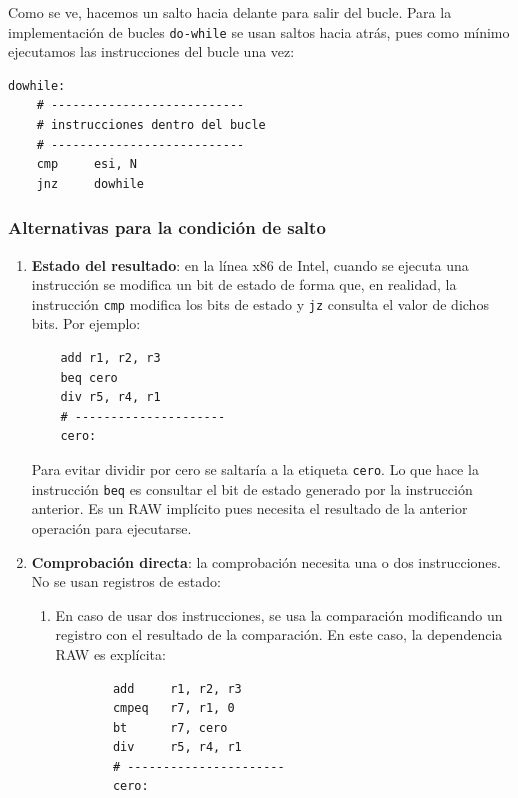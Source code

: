 \documentclass[10pt,a4paper,spanish]{report}
\begin{document}
Como se ve, hacemos un salto hacia delante para salir del bucle. Para la implementación de bucles \verb*|do-while| se usan saltos hacia atrás, pues como mínimo ejecutamos las instrucciones del bucle una vez:

\begin{verbatim}
dowhile:
    # ---------------------------
    # instrucciones dentro del bucle
    # ---------------------------
    cmp     esi, N
    jnz     dowhile
\end{verbatim}

\textcolor{azul}{\subsubsection{Alternativas para la condición de salto}}
\begin{enumerate}[\color{azul}{$\heartsuit$}]
    \item \textbf{\textcolor{azul}{Estado del resultado}}: en la línea x86 de Intel, cuando se ejecuta una instrucción se modifica un bit de estado de forma que, en realidad, la instrucción \verb*|cmp| modifica los bits de estado y \verb*|jz| consulta el valor de dichos bits. Por ejemplo:

    \begin{verbatim}
    add r1, r2, r3
    beq cero
    div r5, r4, r1
    # ---------------------
    cero:
    \end{verbatim}

    Para evitar dividir por cero se saltaría a la etiqueta \verb*|cero|. Lo que hace la instrucción \verb*|beq| es consultar el bit de estado generado por la instrucción anterior. Es un RAW implícito pues necesita el resultado de la anterior operación para ejecutarse.

    \item \textbf{\textcolor{azul}{Comprobación directa}}: la comprobación necesita una o dos instrucciones. No se usan registros de estado:
    \begin{enumerate}[$\longrightarrow$]
        \item En caso de usar dos instrucciones, se usa la comparación modificando un registro con el resultado de la comparación. En este caso, la dependencia RAW es explícita:

        \begin{verbatim}
        add     r1, r2, r3
        cmpeq   r7, r1, 0
        bt      r7, cero
        div     r5, r4, r1
        # ----------------------
        cero:
        \end{verbatim}


\end{enumerate}
\end{enumerate}
\end{document}
